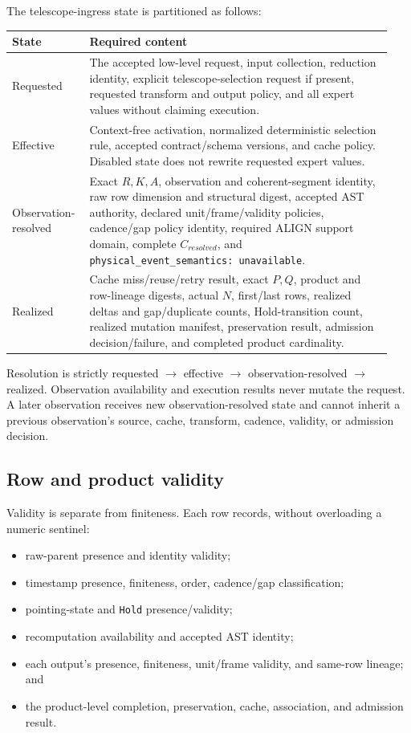 \documentclass[11pt]{article}
\newcommand{\code}[1]{\texttt{#1}}
\newcommand{\typedunavailable}{\code{physical\_event\_semantics:}\allowbreak\ \code{unavailable}}
\begin{document}
The telescope-ingress state is partitioned as follows:

\begin{longtable}{@{}L{0.18\linewidth}L{0.76\linewidth}@{}}
\toprule
State & Required content \\
\midrule
\endhead
Requested & The accepted low-level request, input collection, reduction
identity, explicit telescope-selection request if present, requested transform
and output policy, and all expert values without claiming execution. \\
Effective & Context-free activation, normalized deterministic selection rule,
accepted contract/schema versions, and cache policy.  Disabled state does not
rewrite requested expert values. \\
Observation-resolved & Exact $R,K,A$, observation and coherent-segment
identity, raw row dimension and structural digest, accepted AST authority,
declared unit/frame/validity policies, cadence/gap policy identity, required
ALIGN support domain, complete $C_{resolved}$, and
\typedunavailable. \\
Realized & Cache miss/reuse/retry result, exact $P,Q$, product and row-lineage
digests, actual $N$, first/last rows, realized deltas and gap/duplicate counts,
Hold-transition count, realized mutation manifest, preservation result,
admission decision/failure, and completed product cardinality. \\
\bottomrule
\end{longtable}

Resolution is strictly requested $\rightarrow$ effective $\rightarrow$
observation-resolved $\rightarrow$ realized.  Observation availability and
execution results never mutate the request.  A later observation receives new
observation-resolved state and cannot inherit a previous observation's source,
cache, transform, cadence, validity, or admission decision.

\subsection{Row and product validity}

Validity is separate from finiteness.  Each row records, without overloading a
numeric sentinel:

\begin{itemize}
\item raw-parent presence and identity validity;
\item timestamp presence, finiteness, order, cadence/gap classification;
\item pointing-state and \code{Hold} presence/validity;
\item recomputation availability and accepted AST identity;
\item each output's presence, finiteness, unit/frame validity, and same-row
  lineage; and
\item the product-level completion, preservation, cache, association, and
  admission result.
\end{itemize}
\end{document}
